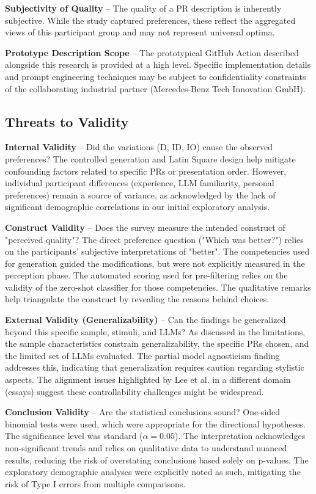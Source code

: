 \documentclass[conference]{IEEEtran}
\begin{document}
\textbf{Subjectivity of Quality} -- The quality of a PR description is inherently subjective. While the study captured preferences, these reflect the aggregated views of this participant group and may not represent universal optima.

\textbf{Prototype Description Scope} -- The prototypical GitHub Action described alongside this research is provided at a high level. Specific implementation details and prompt engineering techniques may be subject to confidentiality constraints of the collaborating industrial partner (Mercedes-Benz Tech Innovation GmbH). 

\subsection{Threats to Validity}

\textbf{Internal Validity} -- Did the variations (D, ID, IO) cause the observed preferences? The controlled generation and Latin Square design help mitigate confounding factors related to specific PRs or presentation order. However, individual participant differences (experience, LLM familiarity, personal preferences) remain a source of variance, as acknowledged by the lack of significant demographic correlations in our initial exploratory analysis.

\textbf{Construct Validity} -- Does the survey measure the intended construct of "perceived quality"? The direct preference question ("Which was better?") relies on the participants' subjective interpretations of "better". The competencies used for generation guided the modifications, but were not explicitly measured in the perception phase. The automated scoring used for pre-filtering relies on the validity of the zero-shot classifier for those competencies. The qualitative remarks help triangulate the construct by revealing the reasons behind choices.

\textbf{External Validity (Generalizability)} -- Can the findings be generalized beyond this specific sample, stimuli, and LLMs? As discussed in the limitations, the sample characteristics constrain generalizability, the specific PRs chosen, and the limited set of LLMs evaluated. The partial model agnosticism finding addresses this, indicating that generalization requires caution regarding stylistic aspects. The alignment issues highlighted by Lee et al. \cite{lee2025poor} in a different domain (essays) suggest these controllability challenges might be widespread.

\textbf{Conclusion Validity} -- Are the statistical conclusions sound? One-sided binomial tests were used, which were appropriate for the directional hypotheses. The significance level was standard ($\alpha=0.05$). The interpretation acknowledges non-significant trends and relies on qualitative data to understand nuanced results, reducing the risk of overstating conclusions based solely on p-values. The exploratory demographic analyses were explicitly noted as such, mitigating the risk of Type I errors from multiple comparisons.
\end{document}

